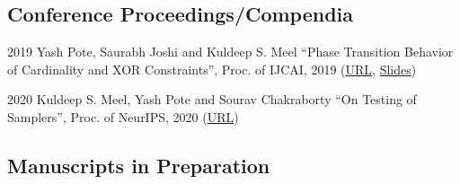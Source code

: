 \documentclass[12pt,letterpaper]{report}
\begin{document}
%
%    	
%
%
%
%
%
%
%
%
%
%



    \subsection*{Conference Proceedings/Compendia}

    \begin{tablist}
        
        \item[2019] \tab Yash Pote, Saurabh Joshi and Kuldeep S. Meel  \enquote{Phase Transition Behavior of Cardinality and
        XOR Constraints}, Proc. of IJCAI, 2019 (\href{https://www.ijcai.org/proceedings/2019/0162.pdf}{URL}, \href{https://meelgroup.github.io/files/slides/ijcai19pjm.pdf}{Slides})
        
		\item[2020] \tab Kuldeep S. Meel, Yash Pote  and Sourav Chakraborty \enquote{On Testing of Samplers}, Proc. of NeurIPS, 2020 (\href{https://arxiv.org/abs/2010.12918}{URL})
		
    \end{tablist}


%

    \subsection*{Manuscripts in Preparation}
\end{document}
